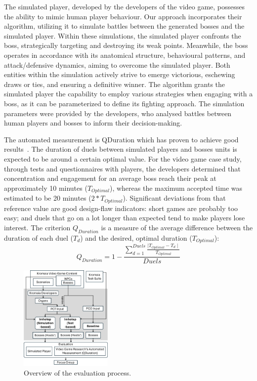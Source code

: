 The simulated player, developed by the developers of the \CaseStudy{} video game, possesses the ability to mimic human player behaviour. Our approach incorporates their algorithm, utilizing it to simulate battles between the generated bosses and the simulated player. Within these simulations, the simulated player confronts the boss, strategically targeting and destroying its weak points. Meanwhile, the boss operates in accordance with its anatomical structure, behavioural patterns, and attack/defensive dynamics, aiming to overcome the simulated player. Both entities within the simulation actively strive to emerge victorious, eschewing draws or ties, and ensuring a definitive winner. The algorithm grants the simulated player the capability to employ various strategies when engaging with a boss, as it can be parameterized to define its fighting approach. The simulation parameters were provided by the developers, who analysed battles between human players and bosses to inform their decision-making.

The automated measurement is QDuration which has proven to achieve good results~\cite{browne2010evolutionary}. The duration of duels between simulated players and bosses units is expected to be around a certain optimal value. For the video game case study, through tests and questionnaires with players, the developers determined that concentration and engagement for an average boss reach their peak at approximately 10 minutes ($T_{Optimal}$), whereas the maximum accepted time was estimated to be 20 minutes ($2*T_{Optimal}$). Significant deviations from that reference value are good design-flaw indicators: short games are probably too easy; and duels that go on a lot longer than expected tend to make players lose interest. The criterion $Q_{Duration}$ is a measure of the average difference between the duration of each duel ($T_{d}$) and the desired, optimal duration ($T_{Optimal}$):
\begin{equation}
Q_{Duration} =  1 - \frac{\sum\limits_{d=1}^{Duels}\frac{\mid T_{Optimal} - T_{d} \mid}{T_{Optimal}}}{Duels} 
\end{equation}

\begin{figure}[h]
    \centering
    \includegraphics[width=0.4\textwidth]{Figures/evaluation_process.png}
    \caption{Overview of the evaluation process.}
    \label{fig:evaluation}
\end{figure}


